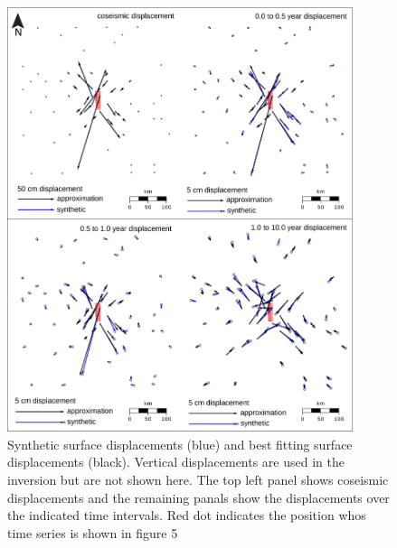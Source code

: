 \documentclass[12pt]{article}
\begin{document}
\begin{figure}[h!]\label{figure4}
  \centering
  \includegraphics[width=0.9\textwidth]{FinalFigures/Figure4.pdf}
  \caption{Synthetic surface displacements (blue) and best fitting
    surface displacements (black).  Vertical displacements are used in
    the inversion but are not shown here.  The top left panel shows
    coseismic displacements and the remaining panals show the
    displacements over the indicated time intervals. Red dot indicates
    the position whos time series is shown in figure 5}
  \label{figure 4}
\end{figure}
\end{document}
